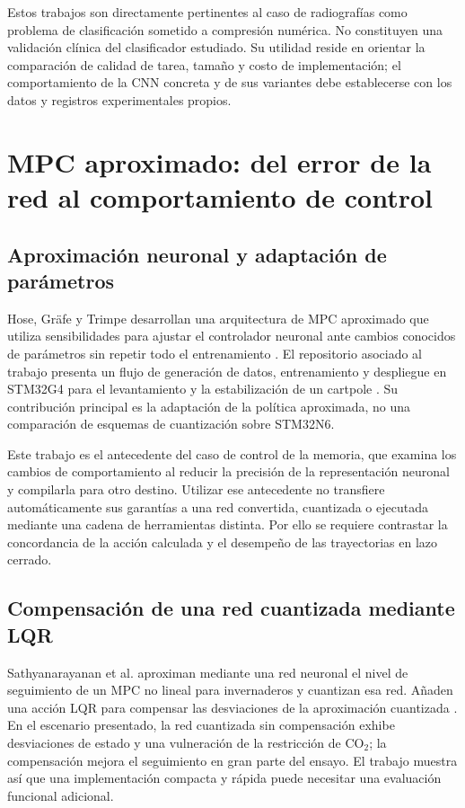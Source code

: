 Estos trabajos son directamente pertinentes al caso de radiografías como problema de clasificación sometido a compresión numérica. No constituyen una validación clínica del clasificador estudiado. Su utilidad reside en orientar la comparación de calidad de tarea, tamaño y costo de implementación; el comportamiento de la CNN concreta y de sus variantes debe establecerse con los datos y registros experimentales propios.

\section{MPC aproximado: del error de la red al comportamiento de control}
\subsection{Aproximación neuronal y adaptación de parámetros}
Hose, Gräfe y Trimpe desarrollan una arquitectura de MPC aproximado que utiliza sensibilidades para ajustar el controlador neuronal ante cambios conocidos de parámetros sin repetir todo el entrenamiento \cite{hose2024}. El repositorio asociado al trabajo presenta un flujo de generación de datos, entrenamiento y despliegue en STM32G4 para el levantamiento y la estabilización de un cartpole \cite{hoserepo}. Su contribución principal es la adaptación de la política aproximada, no una comparación de esquemas de cuantización sobre STM32N6.

Este trabajo es el antecedente del caso de control de la memoria, que examina los cambios de comportamiento al reducir la precisión de la representación neuronal y compilarla para otro destino. Utilizar ese antecedente no transfiere automáticamente sus garantías a una red convertida, cuantizada o ejecutada mediante una cadena de herramientas distinta. Por ello se requiere contrastar la concordancia de la acción calculada y el desempeño de las trayectorias en lazo cerrado.

\subsection{Compensación de una red cuantizada mediante LQR}
Sathyanarayanan et al. aproximan mediante una red neuronal el nivel de seguimiento de un MPC no lineal para invernaderos y cuantizan esa red. Añaden una acción LQR para compensar las desviaciones de la aproximación cuantizada \cite{greenhouse2024}. En el escenario presentado, la red cuantizada sin compensación exhibe desviaciones de estado y una vulneración de la restricción de CO$_2$; la compensación mejora el seguimiento en gran parte del ensayo. El trabajo muestra así que una implementación compacta y rápida puede necesitar una evaluación funcional adicional.

